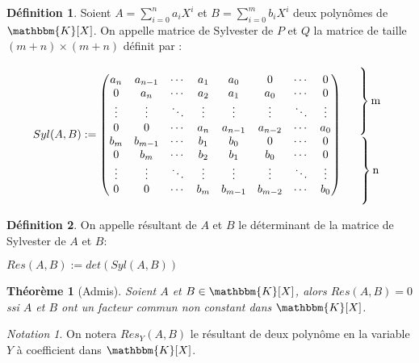 \documentclass[12pt]{article}
\newcommand{\K}{\mathbbm{K}}
\newtheorem{thm}{Théorème}
\theoremstyle{definition}\newtheorem{defn}{Définition}
\theoremstyle{definition}\newtheorem{exm}{Exemple}
\theoremstyle{definition}\newtheorem{rem}{Remarque}
\theoremstyle{definition}\newtheorem{algo}{Algorithme}
\theoremstyle{remark}\newtheorem{exo}{Exercice}
\theoremstyle{remark}\newtheorem{nota}{Notation}
\begin{document}
\begin{defn}
Soient $A = \displaystyle\sum_{i=0}^n a_iX^i$ et $B = \displaystyle\sum_{i=0}^m b_iX^i$ deux polynômes de $\K[X]$. On appelle matrice de Sylvester de $P$ et $Q$ la matrice de taille $(m+n)\times(m+n)$ définit par :
\begin{center}
$$\begin{array}{cc} 
Syl(A,B) :=
   \begin{pmatrix} 
a_n & a_{n-1} & \cdots & a_1 & a_0 & 0 & \cdots & 0 \\
0 & a_n & \cdots & a_2 & a_1	 & a_0 & \cdots & 0 \\
\vdots & \vdots & \ddots & \vdots & \vdots & \vdots & \ddots & \vdots\\
0 & 0 & \cdots & a_n & a_{n-1} & a_{n-2} & \cdots & a_0 \\
b_m & b_{m-1} & \cdots & b_1 & b_0 & 0 & \cdots & 0 \\
0 & b_m & \cdots & b_2 & b_1	 & b_0 & \cdots & 0 \\
\vdots & \vdots & \ddots & \vdots & \vdots & \vdots & \ddots & \vdots\\
0 & 0 & \cdots & b_m & b_{m-1} & b_{m-2} & \cdots & b_0 \\
   \end{pmatrix} 
&  \begin{array}{c} 
      \left. \rule{0pt}{12mm} \right\} \text{m} \\
      \left. \rule{0pt}{12mm} \right\} \text{n} 
   \end{array} 
\end{array}$$
\end{center}
\end{defn}

\begin{defn}
On appelle résultant de $A$ et $B$ le déterminant de la matrice de Sylvester de $A$ et $B$:
\begin{center} $Res(A,B) := det(Syl(A,B))$ \end{center}
\end{defn}

\begin{thm}[Admis]
Soient $A$ et $B \in \K[X]$, alors $Res(A,B) = 0$ ssi $A$ et $B$ ont un facteur commun non constant dans $\K[X]$.
\end{thm}

\begin{nota}
On notera $Res_Y(A,B)$ le résultant de deux polynôme en la variable $Y$ à coefficient dans $\K[X]$.
\end{nota}
\end{document}
